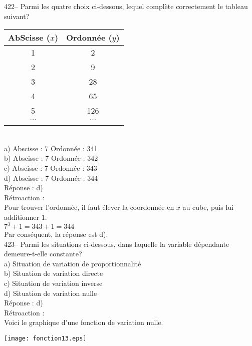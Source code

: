 ﻿\documentclass[letterpaper, 12pt]{article}
\begin{document}
422-- Parmi les quatre choix ci-dessous, lequel compl\`ete correctement le
tableau suivant?\\
\begin{tabular}{|c|c|} \hline

{\bf AbScisse ($x$)} & {\bf Ordonn\'ee ($y$)}  \\ \hline \hline
1 & 2 \\ \hline
2 & 9 \\ \hline
3 & 28 \\ \hline
4 & 65 \\ \hline
5 & 126 \\ \hline
$\ldots$ & $\ldots$ \\ \hline
\multicolumn{2}{c}{}\\
\end{tabular}\\
a) Abscisse : 7 \qquad Ordonn\'ee : 341\\
b) Abscisse : 7 \qquad Ordonn\'ee : 342\\
c) Abscisse : 7 \qquad Ordonn\'ee : 343\\
d) Abscisse : 7 \qquad Ordonn\'ee : 344\\

R\'eponse :  d)\\

R\'etroaction : \\
Pour trouver l'ordonn\'ee, il faut \'elever la coordonn\'ee en $x$ au cube,
puis lui additionner 1.\\
$7^{3}+1=343+1=344$\\
Par cons\'equent, la r\'eponse est d).\\

423-- Parmi les situations ci-dessous, dans laquelle la variable
d\'ependante demeure-t-elle constante?\\
a) Situation de variation de proportionnalit\'e\\
b) Situation de variation directe\\
c) Situation de variation inverse\\
d) Situation de variation nulle\\

R\'eponse :  d)\\

R\'etroaction : \\
Voici le graphique d'une fonction de variation nulle.\\
    \begin{center}
    \texttt{[image: fonction13.eps]}
    \end{center}
\end{document}
